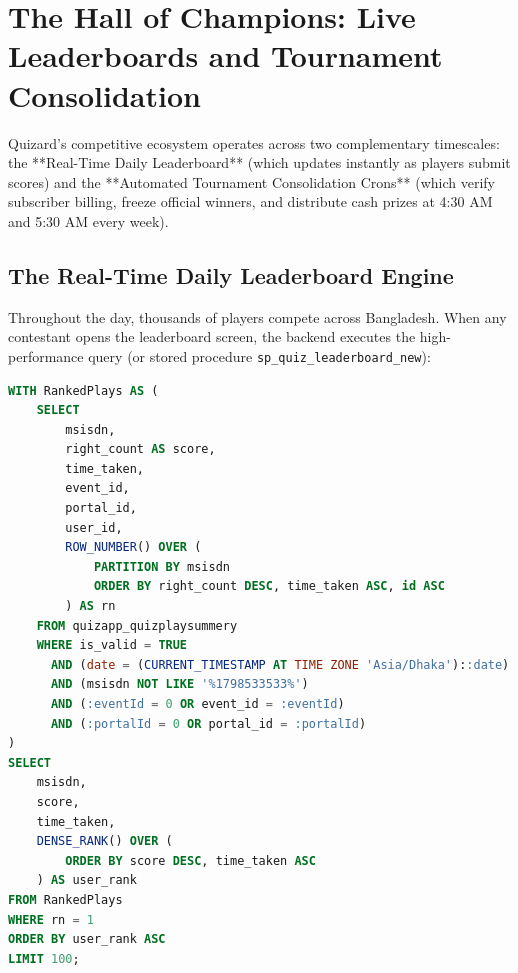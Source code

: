 \chapter{The Hall of Champions: Live Leaderboards and Tournament Consolidation}

\begin{tcolorbox}[storybox, title={The Tournament Engine in Brief}]
Quizard's competitive ecosystem operates across two complementary timescales: the **Real-Time Daily Leaderboard** (which updates instantly as players submit scores) and the **Automated Tournament Consolidation Crons** (which verify subscriber billing, freeze official winners, and distribute cash prizes at 4:30 AM and 5:30 AM every week).
\end{tcolorbox}

\section{The Real-Time Daily Leaderboard Engine}
Throughout the day, thousands of players compete across Bangladesh. When any contestant opens the leaderboard screen, the backend executes the high-performance query (or stored procedure \texttt{sp\_quiz\_leaderboard\_new}):

\begin{lstlisting}[language=sql, caption={The PostgreSQL Leaderboard Window Aggregation Query}]
WITH RankedPlays AS (
    SELECT 
        msisdn, 
        right_count AS score, 
        time_taken, 
        event_id, 
        portal_id, 
        user_id,
        ROW_NUMBER() OVER (
            PARTITION BY msisdn 
            ORDER BY right_count DESC, time_taken ASC, id ASC
        ) AS rn
    FROM quizapp_quizplaysummery
    WHERE is_valid = TRUE 
      AND (date = (CURRENT_TIMESTAMP AT TIME ZONE 'Asia/Dhaka')::date)
      AND (msisdn NOT LIKE '%1798533533%')
      AND (:eventId = 0 OR event_id = :eventId)
      AND (:portalId = 0 OR portal_id = :portalId)
)
SELECT 
    msisdn, 
    score, 
    time_taken,
    DENSE_RANK() OVER (
        ORDER BY score DESC, time_taken ASC
    ) AS user_rank
FROM RankedPlays
WHERE rn = 1
ORDER BY user_rank ASC
LIMIT 100;
\end{lstlisting}

